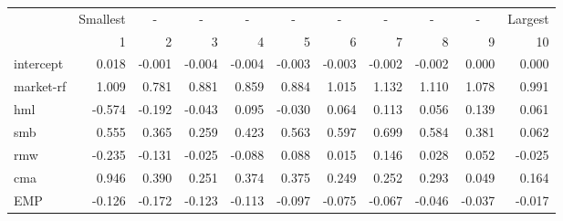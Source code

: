 \begin{tabular}{lrrrrrrrrrr}
      & \multicolumn{1}{l}{Smallest} & \multicolumn{1}{c}{-} & \multicolumn{1}{c}{-} & \multicolumn{1}{c}{-} & \multicolumn{1}{c}{-} & \multicolumn{1}{c}{-} & \multicolumn{1}{c}{-} & \multicolumn{1}{c}{-} & \multicolumn{1}{c}{-} & \multicolumn{1}{l}{Largest} \\
      & 1     & 2     & 3     & 4     & 5     & 6     & 7     & 8     & 9     & 10 \\
intercept & 0.018 & -0.001 & -0.004 & -0.004 & -0.003 & -0.003 & -0.002 & -0.002 & 0.000 & 0.000 \\
market-rf & 1.009 & 0.781 & 0.881 & 0.859 & 0.884 & 1.015 & 1.132 & 1.110 & 1.078 & 0.991 \\
hml   & -0.574 & -0.192 & -0.043 & 0.095 & -0.030 & 0.064 & 0.113 & 0.056 & 0.139 & 0.061 \\
smb   & 0.555 & 0.365 & 0.259 & 0.423 & 0.563 & 0.597 & 0.699 & 0.584 & 0.381 & 0.062 \\
rmw   & -0.235 & -0.131 & -0.025 & -0.088 & 0.088 & 0.015 & 0.146 & 0.028 & 0.052 & -0.025 \\
cma   & 0.946 & 0.390 & 0.251 & 0.374 & 0.375 & 0.249 & 0.252 & 0.293 & 0.049 & 0.164 \\
EMP   & -0.126 & -0.172 & -0.123 & -0.113 & -0.097 & -0.075 & -0.067 & -0.046 & -0.037 & -0.017 \\
\end{tabular}%
